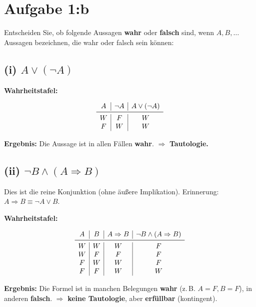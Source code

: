 \documentclass{article}
\begin{document}
\section*{Aufgabe 1:b}
Entscheiden Sie, ob folgende Aussagen \textbf{wahr} oder \textbf{falsch} sind, wenn $A, B, \dots$ Aussagen bezeichnen, die wahr oder falsch sein können:

\subsection*{(i) $A \lor (\neg A)$}

\textbf{Wahrheitstafel:}

\[
    \begin{array}{c|c|c}
        A & \neg A & A \lor (\neg A) \\
        \midrule
        W & F      & W               \\
        F & W      & W               \\
    \end{array}
\]

\textbf{Ergebnis:} Die Aussage ist in allen Fällen \textbf{wahr}.
$\Rightarrow$ \textbf{Tautologie.}

\bigskip
\subsection*{(ii) \(\neg B \land (A \Rightarrow B)\)}

Dies ist die reine Konjunktion (ohne äußere Implikation). Erinnerung: \(A\Rightarrow B \equiv \neg A \lor B\).

\textbf{Wahrheitstafel:}

\[
    \begin{array}{c|c|c|c}
        A & B & A \Rightarrow B & \neg B \land (A \Rightarrow B) \\
        \midrule
        W & W & W               & F                              \\
        W & F & F               & F                              \\
        F & W & W               & F                              \\
        F & F & W               & W                              \\
    \end{array}
\]

\textbf{Ergebnis:} Die Formel ist in manchen Belegungen \textbf{wahr} (z.\,B. \(A=F,B=F\)), in anderen \textbf{falsch}.
$\Rightarrow$ \textbf{keine Tautologie}, aber \textbf{erfüllbar} (kontingent).
\end{document}

